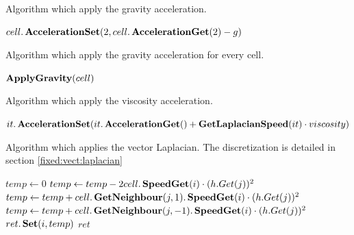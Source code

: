 \begin{algorithm}
\caption{Algorithm which apply the gravity acceleration.}
\label{code:ApplyGravity}
\begin{algorithmic}[1]
		\State $cell.\mathop{\textbf{AccelerationSet}}(2,cell.\mathop{\textbf{AccelerationGet}}(2)-g)$ 
		\EndIf
\EndFunction
	\end{algorithmic}
\end{algorithm}

\begin{algorithm}
\caption{Algorithm which apply the gravity acceleration for every cell.}
\label{code:ApplyGravityCell}
\begin{algorithmic}[1]
		\State $\mathop{\textbf{ApplyGravity}}(cell)$
		\EndFor
\EndProcedure
	\end{algorithmic}
\end{algorithm}

\begin{algorithm}
\caption{Algorithm which apply the viscosity acceleration.}
\label{code:ApplyViscosity}
\begin{algorithmic}[1]
				\State $it.\mathop{\textbf{AccelerationSet}}(it.\mathop{\textbf{AccelerationGet}}()+\mathop{\textbf{GetLaplacianSpeed}}(it)\cdot viscosity)$
			\EndIf
		\EndFor
	\EndProcedure
	\end{algorithmic}
\end{algorithm}

\begin{algorithm}
\caption{Algorithm which applies the vector Laplacian. The discretization is detailed in section \ref{fixed:vect:laplacian}}
\label{code:GetLaplacianSpeed}
\begin{algorithmic}[1]
		\State $temp \gets 0$
				\State $temp\gets temp-2cell.\mathop{\textbf{SpeedGet}}(i)\cdot (h.Get(j))^2$
				\State $temp\gets temp+cell.\mathop{\textbf{GetNeighbour}}(j,1).\mathop{\textbf{SpeedGet}}(i)\cdot (h.Get(j))^2$
				\State $temp \gets temp+cell.\mathop{\textbf{GetNeighbour}}(j,-1).\mathop{\textbf{SpeedGet}}(i)\cdot (h.Get(j))^2$
			\EndFor
			\State $ret.\mathop{\textbf{Set}}(i,temp)$
		\EndFor
		\State \Return $ret$ 
	\EndFunction
	\end{algorithmic}
\end{algorithm}



